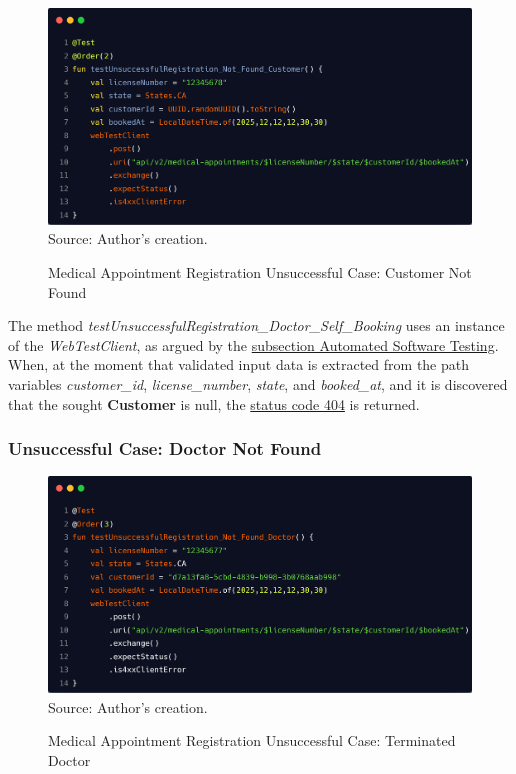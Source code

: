 \begin{figure}[H]
	\centering
	\caption{Medical Appointment Registration Unsuccessful Case: Customer Not Found}
	\includegraphics[width=1\linewidth]{figures/medical_appointment_registration_integration_test_unsuccessful_case_customer_not_found.png}
	\label{fig:medical_appointment_registration_integration_test_unsuccessful_case_customer_not_found}
	\footnotesize Source: Author's creation.
\end{figure}

The method \textit{testUnsuccessfulRegistration\_Doctor\_Self\_Booking} uses an instance of the \textit{WebTestClient}, as argued by the \hyperref[subsection:automated_software_testing]{subsection Automated Software Testing}. When, at the moment that validated input data is extracted from the path variables \textit{customer\_id}, \textit{license\_number}, \textit{state}, and \textit{booked\_at}, and it is discovered that the sought \textbf{Customer} is null, the \hyperref[tab:summary_http_status_codes]{status code 404} is returned.

\subsubsection{Unsuccessful Case: Doctor Not Found}

\begin{figure}[H]
	\centering
	\caption{Medical Appointment Registration Unsuccessful Case: Terminated Doctor}
	\includegraphics[width=1\linewidth]{figures/medical_appointment_registration_integration_test_unsuccessful_case_doctor_not_found.png}
	\label{fig:/medical_appointment_registration_integration_test_unsuccessful_case_doctor_not_found}
	\footnotesize Source: Author's creation.
\end{figure}

